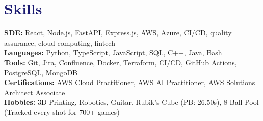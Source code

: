 \documentclass[letterpaper,11pt]{article}
\newcommand\accentColor{MidnightBlue}
\begin{document}
\section{\textcolor{\accentColor}{Skills}}
\begin{itemize}[leftmargin=0.15in, label={}]
  \small{\item{
        \textbf{SDE: }{React, Node.js, FastAPI, Express.js, AWS, Azure, CI/CD, quality assurance, cloud computing, fintech} \\
        \textbf{Languages: }{Python, TypeScript, JavaScript, SQL, C++, Java, Bash} \\
        \textbf{Tools: }{Git, Jira, Confluence, Docker, Terraform, CI/CD, GitHub Actions, PostgreSQL, MongoDB} \\
        \textbf{Certifications: }{AWS Cloud Practitioner, AWS AI Practitioner, AWS Solutions Architect Associate} \\
        \textbf{Hobbies: }{3D Printing, Robotics, Guitar, Rubik's Cube (PB: 26.50s), 8-Ball Pool (Tracked every shot for 700+ games)}
        }}
\end{itemize}
\vspace{-10pt}
\end{document}
